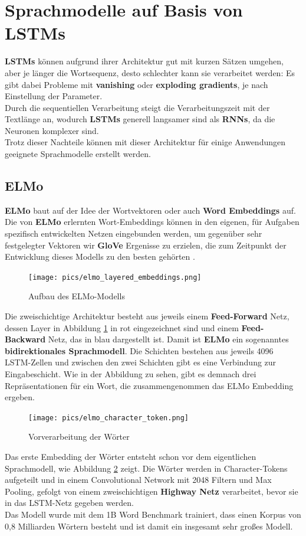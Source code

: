 \section{Sprachmodelle auf Basis von LSTMs}
\textbf{LSTMs} k\"onnen aufgrund ihrer Architektur gut mit kurzen S\"atzen umgehen, aber je l\"anger die Wortsequenz, desto schlechter kann sie verarbeitet werden: Es gibt dabei Probleme mit \textbf{vanishing} oder \textbf{exploding gradients}, je nach Einstellung der Parameter.\\
Durch die sequentiellen Verarbeitung steigt die Verarbeitungszeit mit der Textl\"ange an, wodurch \textbf{LSTMs} generell langsamer sind als \textbf{RNNs}, da die Neuronen komplexer sind.\\
Trotz dieser Nachteile k\"onnen mit dieser Architektur f\"ur einige Anwendungen geeignete Sprachmodelle erstellt werden.

\subsection{ELMo}
\textbf{ELMo} baut auf der Idee der Wortvektoren oder auch \textbf{Word Embeddings} auf. Die von \textbf{ELMo} erlernten Wort-Embeddings k\"onnen in den eigenen, f\"ur Aufgaben spezifisch entwickelten Netzen eingebunden werden, um gegen\"uber sehr festgelegter Vektoren wir \textbf{GloVe} Ergenisse zu erzielen, die zum Zeitpunkt der Entwicklung dieses Modells zu den besten geh\"orten \cite{elmo}.\\
\begin{figure}[!ht]
\centering
\texttt{[image: pics/elmo\_layered\_embeddings.png]}
\caption{Aufbau des ELMo-Modells \cite{elmoex}}
\label{fig:elmo_layers}
\end{figure}
Die zweischichtige Architektur besteht aus jeweils einem \textbf{Feed-Forward} Netz, dessen Layer in Abbildung \ref{fig:elmo_layers} in rot eingezeichnet sind und einem \textbf{Feed-Backward} Netz, das in blau dargestellt ist. Damit ist \textbf{ELMo} ein sogenanntes \textbf{bidirektionales Sprachmodell}. Die Schichten bestehen aus jeweils 4096 LSTM-Zellen und zwischen den zwei Schichten gibt es eine Verbindung zur Eingabeschicht. Wie in der Abbildung zu sehen, gibt es demnach drei Repr\"asentationen f\"ur ein Wort, die zusammengenommen das ELMo Embedding ergeben.\\
\begin{figure}[!ht]
\centering
\texttt{[image: pics/elmo\_character\_token.png]}
\caption{Vorverarbeitung der W\"orter \cite{elmoex}}
\label{fig:elmo_character}
\end{figure}
Das erste Embedding der W\"orter entsteht schon vor dem eigentlichen Sprachmodell, wie Abbildung \ref{fig:elmo_character} zeigt. Die W\"orter werden in Character-Tokens aufgeteilt und in einem Convolutional Network mit 2048 Filtern und Max Pooling, gefolgt von einem zweischichtigen \textbf{Highway Netz} verarbeitet, bevor sie in das LSTM-Netz gegeben werden.\\
Das Modell wurde mit dem 1B Word Benchmark trainiert, dass einen Korpus von 0,8 Milliarden W\"ortern besteht und ist damit ein insgesamt sehr gro{\ss}es Modell.


